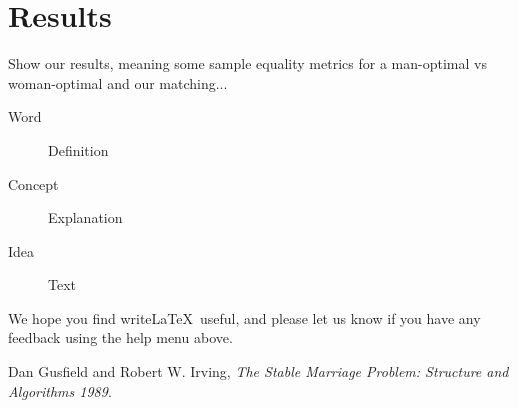 \documentclass[a4paper]{article}
\begin{document}

\section{Results}
Show our results, meaning some sample equality metrics for a man-optimal vs woman-optimal and our matching...

\begin{description}
\item[Word] Definition
\item[Concept] Explanation
\item[Idea] Text
\end{description}

We hope you find write\LaTeX\ useful, and please let us know if you have any feedback using the help menu above.

\begin{thebibliography}{9}
  Dan Gusfield and Robert W. Irving,
  \emph{The Stable Marriage Problem: Structure and Algorithms 1989}.

\end{thebibliography}
\end{document}

